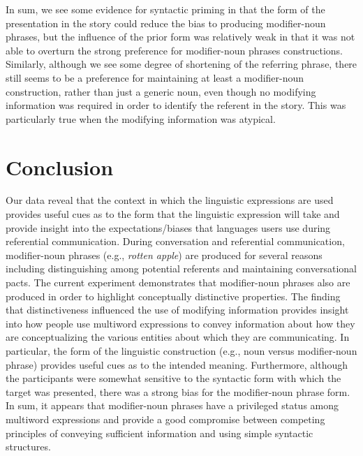 \documentclass[output=paper]{langsci/langscibook}
\begin{document}
In sum, we see some evidence for syntactic priming in that the form of
the presentation in the story could reduce the bias to producing
modifier-noun phrases, but the influence of the prior form was
relatively weak in that it was not able to overturn the strong
preference for modifier-noun phrases constructions. Similarly,
although we see some degree of shortening of the referring phrase,
there still seems to be a preference for maintaining at least a
modifier-noun construction, rather than just a generic noun, even
though no modifying information was required in order to identify the
referent in the story. This was particularly true when the modifying
information was atypical.


\section{Conclusion}

Our data reveal that the context in which the linguistic expressions
are used provides useful cues as to the form that the linguistic
expression will take and provide insight into the expectations/biases
that languages users use during referential communication. During
conversation and referential communication, modifier-noun phrases
(e.g., \textit{rotten apple}) are produced for several reasons
including distinguishing among potential referents and maintaining
conversational pacts. The current experiment demonstrates that
modifier-noun phrases also are produced in order to highlight
conceptually distinctive properties. The finding that distinctiveness
influenced the use of modifying information provides insight into how
people use multiword expressions to convey information about how they
are conceptualizing the various entities about which they are
communicating. In particular, the form of the linguistic construction
(e.g., noun versus modifier-noun phrase) provides useful cues as to
the intended meaning. Furthermore, although the participants were
somewhat sensitive to the syntactic form with which the target was
presented, there was a strong bias for the modifier-noun phrase form.
In sum, it appears that modifier-noun phrases have a privileged status
among multiword expressions and provide a good compromise between
competing principles of conveying sufficient information and using
simple syntactic structures.



{\sloppy
  \printbibliography[heading=subbibliography,notkeyword=this]
}
\end{document}
